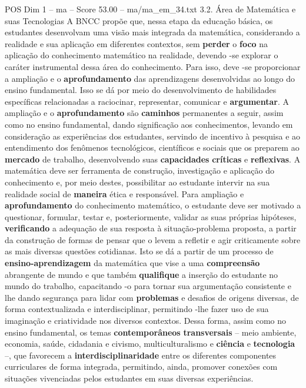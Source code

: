\begin{textsample}{POS Dim 1 – ma – Score 53.00 – ma/ma\_em\_34.txt}  \label{ex:f1_pos_067}
3.2.
Área de Matemática e suas Tecnologias A BNCC propõe que, nessa etapa da educação básica, os estudantes desenvolvam uma visão mais integrada da matemática, considerando a realidade e sua aplicação em diferentes contextos, sem \textbf{perder} o \textbf{foco} na aplicação do conhecimento matemático na realidade, devendo -se explorar o caráter instrumental dessa área do conhecimento.
Para isso, deve -se proporcionar a ampliação e o \textbf{aprofundamento} das aprendizagens desenvolvidas ao longo do ensino fundamental.
Isso se dá por meio do desenvolvimento de habilidades específicas relacionadas a raciocinar, representar, comunicar e \textbf{argumentar}.
A ampliação e o \textbf{aprofundamento} são \textbf{caminhos} permanentes a seguir, assim como no ensino fundamental, dando significação aos conhecimentos, levando em consideração as experiências dos estudantes, servindo de incentivo à pesquisa e ao entendimento dos fenômenos tecnológicos, científicos e sociais que os preparem ao \textbf{mercado} de trabalho, desenvolvendo suas \textbf{capacidades} \textbf{críticas} e \textbf{reflexivas}.
A matemática deve ser ferramenta de construção, investigação e aplicação do conhecimento e, por meio destes, possibilitar ao estudante intervir na sua realidade social de \textbf{maneira} ética e responsável.
Para ampliação e \textbf{aprofundamento} do conhecimento matemático, o estudante deve ser motivado a questionar, formular, testar e, posteriormente, validar as suas próprias hipóteses, \textbf{verificando} a adequação de sua resposta à situação-problema proposta, a partir da construção de formas de pensar que o levem a refletir e agir criticamente sobre as mais diversas questões cotidianas.
Isto se dá a partir de um processo de \textbf{ensino-aprendizagem} da matemática que vise a uma \textbf{compreensão} abrangente de mundo e que também \textbf{qualifique} a inserção do estudante no mundo do trabalho, capacitando -o para tornar sua argumentação consistente e lhe dando segurança para lidar com \textbf{problemas} e desafios de origens diversas, de forma contextualizada e interdisciplinar, permitindo -lhe fazer uso de sua imaginação e criatividade nos diversos contextos.
Dessa forma, assim como no ensino fundamental, os temas \textbf{contemporâneos} \textbf{transversais} – meio ambiente, economia, saúde, cidadania e civismo, multiculturalismo e \textbf{ciência} e \textbf{tecnologia} –, que favorecem a \textbf{interdisciplinaridade} entre os diferentes componentes curriculares de forma integrada, permitindo, ainda, promover conexões com situações vivenciadas pelos estudantes em suas diversas experiências.

\end{textsample}
